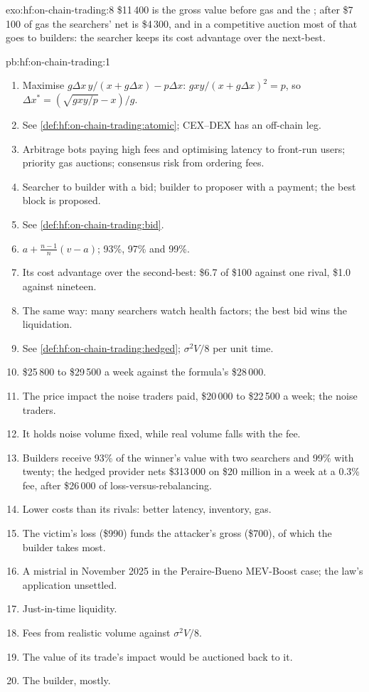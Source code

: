 \begin{solution}{exo:hf:on-chain-trading:8}
\$11\,400 is the gross value before gas and the ; after \$7\,100 of gas the searchers' net is \$4\,300, and in a competitive auction most of
that goes to builders: the searcher keeps its cost advantage over the next-best.
\end{solution}

\begin{solution}{pb:hf:on-chain-trading:1}
\begin{enumerate}
\item Maximise $g\Delta x\,y/(x+g\Delta x)-p\Delta x$: $g xy/(x+g\Delta x)^2=p$, so $\Delta x^\ast=(\sqrt{gxy/p}-x)/g$.
\item See \cref{def:hf:on-chain-trading:atomic}; CEX--DEX has an off-chain leg.
\item Arbitrage bots paying high fees and optimising latency to front-run users; priority gas auctions; consensus risk from ordering fees.
\item Searcher to builder with a bid; builder to proposer with a payment; the best block is proposed.
\item See \cref{def:hf:on-chain-trading:bid}.
\item $a+\frac{n-1}{n}(v-a)$; 93\%, 97\% and 99\%.
\item Its cost advantage over the second-best: \$6.7 of \$100 against one rival, \$1.0 against nineteen.
\item The same way: many searchers watch health factors; the best bid wins the liquidation.
\item See \cref{def:hf:on-chain-trading:hedged}; $\sigma^2V/8$ per unit time.
\item \$25\,800 to \$29\,500 a week against the formula's \$28\,000.
\item The price impact the noise traders paid, \$20\,000 to \$22\,500 a week; the noise traders.
\item It holds noise volume fixed, while real volume falls with the fee.
\item Builders receive 93\% of the winner's value with two searchers and 99\% with twenty; the hedged provider nets \$313\,000 on \$20 million in a
week at a 0.3\% fee, after \$26\,000 of loss-versus-rebalancing.
\item Lower costs than its rivals: better latency, inventory, gas.
\item The victim's loss (\$990) funds the attacker's gross (\$700), of which the builder takes most.
\item A mistrial in November 2025 in the Peraire-Bueno MEV-Boost case; the law's application unsettled.
\item Just-in-time liquidity.
\item Fees from realistic volume against $\sigma^2V/8$.
\item The value of its trade's impact would be auctioned back to it.
\item The builder, mostly.
\end{enumerate}
\end{solution}

